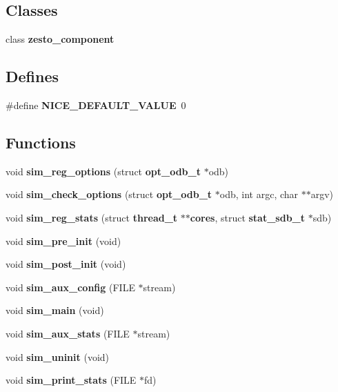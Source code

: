 \subsection*{Classes}
\begin{CompactItemize}
\item 
class {\bf zesto\_\-component}
\end{CompactItemize}
\subsection*{Defines}
\begin{CompactItemize}
\item 
\#define {\bf NICE\_\-DEFAULT\_\-VALUE}~0
\end{CompactItemize}
\subsection*{Functions}
\begin{CompactItemize}
\item 
void {\bf sim\_\-reg\_\-options} (struct {\bf opt\_\-odb\_\-t} $\ast$odb)
\item 
void {\bf sim\_\-check\_\-options} (struct {\bf opt\_\-odb\_\-t} $\ast$odb, int argc, char $\ast$$\ast$argv)
\item 
void {\bf sim\_\-reg\_\-stats} (struct {\bf thread\_\-t} $\ast$$\ast${\bf cores}, struct {\bf stat\_\-sdb\_\-t} $\ast$sdb)
\item 
void {\bf sim\_\-pre\_\-init} (void)
\item 
void {\bf sim\_\-post\_\-init} (void)
\item 
void {\bf sim\_\-aux\_\-config} (FILE $\ast$stream)
\item 
void {\bf sim\_\-main} (void)
\item 
void {\bf sim\_\-aux\_\-stats} (FILE $\ast$stream)
\item 
void {\bf sim\_\-uninit} (void)
\item 
void {\bf sim\_\-print\_\-stats} (FILE $\ast$fd)
\end{CompactItemize}
